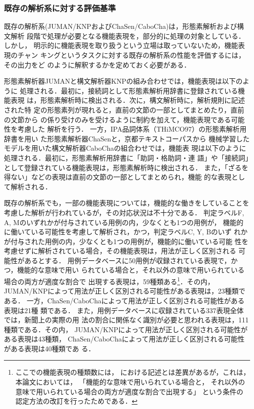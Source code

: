 \documentclass[japanese]{jnlp_1.3e}
\begin{document}
\subsubsection{既存の解析系に対する評価基準}
\label{subsec:既存の解析系}

既存の解析系(JUMAN/KNPおよびChaSen/CaboCha)は，形態素解析および構文解析
段階で処理が必要となる機能表現を，部分的に処理の対象としている．しかし，
明示的に機能表現を取り扱うという立場は取っていないため，機能表現のチャン
キングというタスクに対する既存の解析系の性能を評価するには，その出力をど
のように解釈するかを定めておく必要がある．

形態素解析器JUMANと構文解析器KNPの組み合わせでは，機能表現は以下のように
処理される．最初に，接続詞として形態素解析用辞書に登録されている機能表現
は，形態素解析時に検出される．次に，構文解析時に，解析規則に記述された特
定の形態素列が現れると，直前の文節の一部としてまとめたり，直前の文節から
の係り受けのみを受けるように制約を加えて，機能表現である可能性を考慮した
解析を行う．
一方，IPA品詞体系（THiMCO97）の形態素解析用辞書\cite{ipadic-2.6.1}を用い
た形態素解析器ChaSenと，京都テキストコーパス\cite{Kurohashi97bj}から
機械学習したモデルを用いた構文解析器CaboChaの組合わせでは，機能表
現は以下のように処理される．最初に，形態素解析用辞書に「助詞・格助詞・連
語」や「接続詞」として登録されている機能表現は，形態素解析時に検出される．
また，「ざるを得ない」などの表現は直前の文節の一部としてまとめられ，機能
的な表現として解析される．

既存の解析系でも，一部の機能表現については，機能的な働きをしていることを
考慮した解析が行われているが，その対応状況は不十分である．
判定ラベルF, A, Mのいずれかが付与されている用例の内，少なくとも1つの用例が，
機能的に働いている可能性を考慮して解析され，かつ，判定ラベルC, Y, Bのいず
れかが付与された用例の内，少なくとも1つの用例が，機能的に働いている可能
性を考慮せずに解析されている場合，その機能表現は，用法が正しく区別される
可能性があるとする．
用例データベースに50用例が収録されている表現で，かつ，機能的な意味で用い
られている場合と，それ以外の意味で用いられている場合の両方が適度な割合で
出現する表現は，59種類ある\footnote{
  ここでの機能表現の種類数には，
  \cite{Tsuchiya07aj}における記述とは差異があるが，これは，
  本論文においては，
  「機能的な意味で用いられている場合と，
   それ以外の意味で用いられている場合の両方が適度な割合で出現する」
   という条件の認定方法の改訂を行ったためである．
}．その内，
JUMAN/KNPによって用法が正しく区別される可能性がある表現は，23種類である．
一方，ChaSen/CaboChaによって用法が正しく区別される可能性がある表現は21種
類である．
また，用例データベースに収録されている337表現全体では，新聞上の実際の用
法の割合に関係なく識別が必要と思われる表現は，111種類である．その内，
JUMAN/KNPによって用法が正しく区別される可能性がある表現は43種類，
ChaSen/CaboChaによって用法が正しく区別される可能性がある表現は40種類であ
る．
\end{document}
